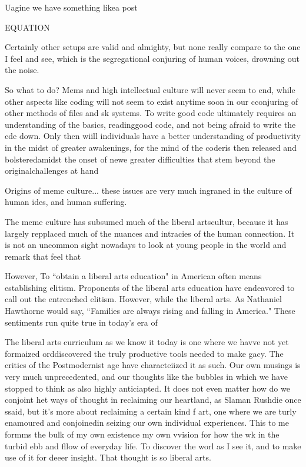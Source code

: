 \documentclass[12pt,letterpaper]{article}
\begin{document}
Uagine we have something likea  post

EQUATION

Certainly other setups are valid and almighty, but none  really compare to the one I feel and see, which is the segregational conjuring of human voices, drowning out the noise.

So what to do?  Mems and high intellectual culture will never seem to end, while other aspects like coding will not seem to  exist anytime soon in our cconjuring  of  other  methods of files  and sk systems.  To write good code ultimately requires an understanding of the basics, readinggood code, and not being afraid to write the cde down.  Only then wiill  individuals have a better understanding of productivity in the midst of greater awakenings, for the mind of the coderis then released and bolsteredamidst the onset of newe greater difficulties that stem beyond the originalchallenges at hand

Origins of meme culture...
these  issues are very much ingraned in the culture of human ides, and human suffering.  

The meme culture has subsumed much of the liberal artscultur, because it has largely repplaced much of the nuances and intracies of the human connection.  It is not an uncommon  sight nowadays to look at young people in the world and remark that feel that 

However, To ``obtain a liberal arts education" in American often means establishing elitism.  Proponents of the liberal arts education have endeavored to call out the entrenched elitism.  However, while the liberal arts.  As Nathaniel Hawthorne would say, ``Families are always rising and falling in America."  These sentiments run quite true in today's era of 

The liberal arts curriculum as we know it today is one where we havve not yet formaized orddiscovered the truly productive tools needed to make gacy.  The critics of the Postmodernist age have characteiized it as such.  Our own musings is very much unprecedented, and our thoughts like the bubbles in which we have stopped to think as also highly anticiapted.  It does not even matter how do we conjoint het ways of thought in reclaiming our heartland, as Slaman Rushdie once ssaid, but it's more about reclaiming a certain kind f art, one where we are turly enamoured and conjoinedin seizing our own individual experiences.  This to me formms the bulk of my own existence my own vvision for how the wk in the turbid ebb and fllow of everyday life.  To discover the worl as I see it, and to make use of it for deeer insight.  That thought is so liberal arts.
\end{document}
